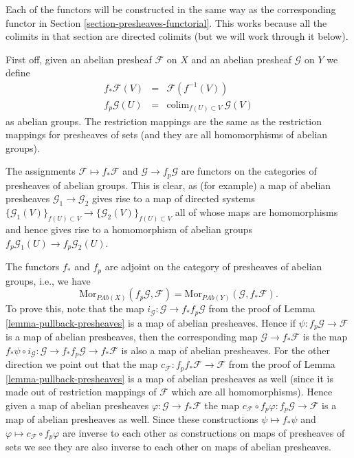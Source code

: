 \medskip\noindent
Each of the functors will be constructed in the same
way as the corresponding functor in
Section \ref{section-presheaves-functorial}.
This works because all the colimits in that section
are directed colimits (but we will work through it below).

\medskip\noindent
First off, given an abelian presheaf $\mathcal{F}$ on $X$ and
an abelian presheaf $\mathcal{G}$ on $Y$ we define
\begin{eqnarray*}
f_*\mathcal{F}(V) & = & \mathcal{F}(f^{-1}(V)) \\
f_p\mathcal{G}(U) & = & \text{colim}_{f(U) \subset V}\ \mathcal{G}(V)
\end{eqnarray*}
as abelian groups. The restriction mappings are the same as 
the restriction mappings for presheaves of sets (and they are
all homomorphisms of abelian groups).

\medskip\noindent
The assignments $\mathcal{F} \mapsto f_*\mathcal{F}$ and
$\mathcal{G} \to f_p\mathcal{G}$ are functors on
the categories of presheaves of abelian groups.
This is clear, as (for example) a map of abelian presheaves
$\mathcal{G}_1 \to \mathcal{G}_2$ gives rise to a map of
directed systems
$\{\mathcal{G}_1(V)\}_{f(U) \subset V} \to 
\{\mathcal{G}_2(V)\}_{f(U) \subset V}$
all of whose maps are homomorphisms
and hence gives rise to a homomorphism of abelian groups
$f_p\mathcal{G}_1(U) \to f_p\mathcal{G}_2(U)$.

\medskip\noindent
The functors $f_*$ and $f_p$ are adjoint on the
category of presheaves of abelian groups, i.e., we have
$$
\text{Mor}_{\textit{PAb}(X)}(f_p\mathcal{G}, \mathcal{F})
=
\text{Mor}_{\textit{PAb}(Y)}(\mathcal{G}, f_*\mathcal{F}).
$$
To prove this, note that the map
$i_\mathcal{G} : \mathcal{G} \to f_* f_p\mathcal{G}$ from the proof
of Lemma \ref{lemma-pullback-presheaves}
is a map of abelian presheaves. Hence if
$\psi : f_p\mathcal{G} \to \mathcal{F}$
is a map of abelian presheaves, then the corresponding map
$\mathcal{G} \to f_*\mathcal{F}$ is the map
$f_*\psi \circ i_\mathcal{G} :
\mathcal{G} \to f_* f_p \mathcal{G} \to f_* \mathcal{F}$
is also a map of abelian presheaves. For the other direction
we point out that the map
$c_{\mathcal{F}} : f_p f_* \mathcal{F} \to \mathcal{F}$
from the proof of Lemma \ref{lemma-pullback-presheaves} is a
map of abelian presheaves as well (since it is made out of restriction
mappings of $\mathcal{F}$ which are all homomorphisms). Hence
given a map of abelian presheaves $\varphi : \mathcal{G} \to f_*\mathcal{F}$
the map
$c_{\mathcal{F}} \circ f_p\varphi : f_p\mathcal{G} \to \mathcal{F}$
is a map of abelian presheaves as well. Since these constructions
$\psi \mapsto f_*\psi$ and $\varphi \mapsto c_{\mathcal{F}} \circ f_p\varphi$
are inverse to each other as constructions on maps of presheaves of sets
we see they are also inverse to each other on maps of abelian presheaves.

